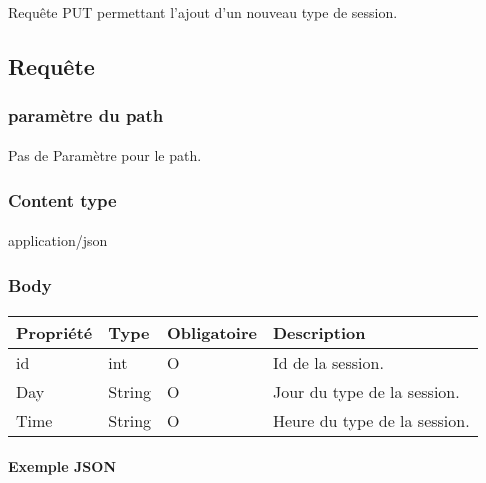 \paragraph{}
	Requête PUT permettant l'ajout d'un nouveau type de session.

\subsection{Requête}
	\subsubsection{paramètre du path}
		\paragraph{}
			Pas de Paramètre pour le path.
	
	\subsubsection{Content type}
		\paragraph{}
			application/json
			
	\subsubsection{Body}
		\paragraph{}
			\begin{center}
				\begin{tabularx}{\textwidth}{| T{0.2122\textwidth} | S{0.22\textwidth} | S{0.15\textwidth} | S{0.3\textwidth} |}
					\hline
					Propriété & Type & Obligatoire & Description \\
					\hline
					id & int & O & Id de la session. \\
					\hline
					Day & String & O & Jour du type de la session. \\
					\hline
					Time & String & O & Heure du type de la session. \\
					\hline
				\end{tabularx}
			\end{center}
			
		\paragraph{Exemple JSON}
